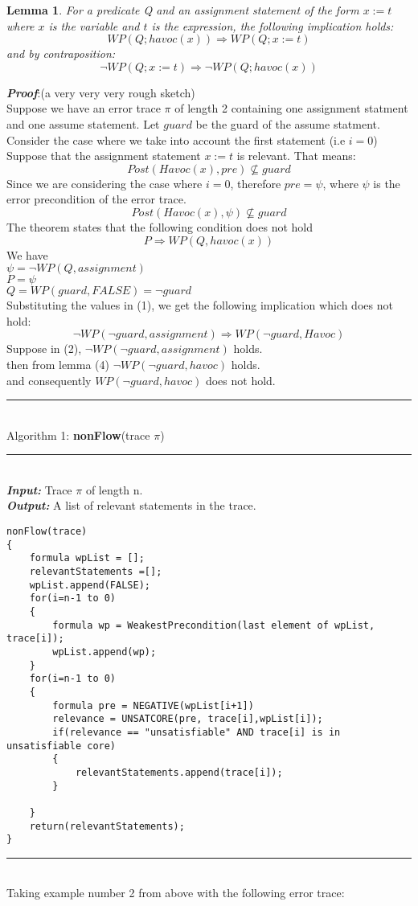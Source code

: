 \documentclass{article}
\newtheorem{lemma}{Lemma}
\begin{document}
\begin{lemma}
For a predicate Q and an assignment statement of the form $x:=t$ where $x$ is the variable and $t$ is the expression, the following implication holds:
$$WP(Q;havoc(x)) \Rightarrow WP(Q;x:=t)$$
and by contraposition:
$$\neg WP(Q;x:=t) \Rightarrow \neg WP(Q;havoc(x))$$
\end{lemma}

\textit{\textbf{Proof}}:(a very very very rough sketch)\\
Suppose we have an error trace $\pi$ of length 2 containing one assignment statment and one assume statement. Let $guard$ be the guard of the assume statment.\\
Consider the case where we take into account the first statement (i.e $i=0$)\\
Suppose that the assignment statement $x:=t$ is relevant. That means:
$$Post(Havoc(x), pre) \not \subseteq guard$$
Since we are considering the case where $i=0$, therefore $pre=\psi$, where $\psi$ is the error precondition of the error trace.
$$Post(Havoc(x), \psi) \not \subseteq guard$$
The theorem states that the following condition does not hold 
\begin{equation} 
P \Rightarrow WP(Q,havoc(x)) 
\end{equation}
We have\\
$\psi = \neg WP(Q, assignment)$\\
$P =  \psi$\\
$Q = WP(guard, FALSE) = \neg guard$\\
Substituting the values in (1), we get the following implication which does not hold:
\begin{equation}
\neg WP(\neg guard, assignment) \Rightarrow WP(\neg guard, Havoc)
\end{equation}
Suppose in (2), $\neg WP(\neg guard, assignment)$ holds.\\
then from lemma (4) $\neg WP(\neg guard, havoc)$ holds.\\
and consequently $WP(\neg guard,havoc)$ does not hold.



\newpage
\rule{\textwidth}{1pt}\\
Algorithm 1: \textbf{nonFlow}(trace $\pi$)\\
\noindent\rule{12cm}{0.4pt}\\
\textbf{\textit{Input:}} Trace $\pi$ of length n.\\
\textbf{\textit{Output:}} A list of relevant statements in the trace.
\begin{lstlisting}
nonFlow(trace)
{
	formula wpList = [];
	relevantStatements =[];
	wpList.append(FALSE);
	for(i=n-1 to 0)
	{
		formula wp = WeakestPrecondition(last element of wpList, trace[i]);
		wpList.append(wp);
	}
	for(i=n-1 to 0)
	{
		formula pre = NEGATIVE(wpList[i+1])
		relevance = UNSATCORE(pre, trace[i],wpList[i]);
		if(relevance == "unsatisfiable" AND trace[i] is in unsatisfiable core)
		{
			relevantStatements.append(trace[i]);
		}
		
	}
	return(relevantStatements);
}
\end{lstlisting}
\rule{\textwidth}{1pt}\\
Taking example number 2 from above with the following error trace:
\end{document}
